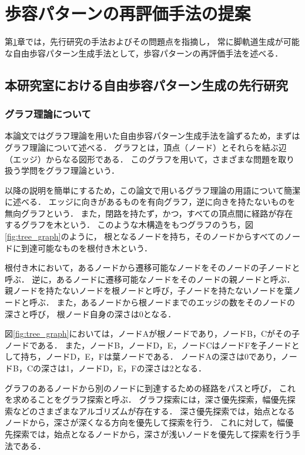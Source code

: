 ﻿%


\chapter{歩容パターンの再評価手法の提案}\label{chapter:歩容パターンの再評価手法の提案}
第\ref{chapter:歩容パターンの再評価手法の提案}章では，先行研究の手法およびその問題点を指摘し，
常に脚軌道生成が可能な自由歩容パターン生成手法として，歩容パターンの再評価手法を述べる．

\section{本研究室における自由歩容パターン生成の先行研究}
\subsection{グラフ理論について}
本論文ではグラフ理論を用いた自由歩容パターン生成手法を論ずるため，まずはグラフ理論について述べる．
グラフとは，頂点（ノード）とそれらを結ぶ辺（エッジ）からなる図形である．
このグラフを用いて，さまざまな問題を取り扱う学問をグラフ理論という．

以降の説明を簡単にするため，この論文で用いるグラフ理論の用語について簡潔に述べる．
エッジに向きがあるものを有向グラフ，逆に向きを持たないものを無向グラフという．
また，閉路を持たず，かつ，すべての頂点間に経路が存在するグラフを木という．
このような木構造をもつグラフのうち，図\ref*{fig:tree_graph}のように，
根となるノードを持ち，そのノードからすべてのノードに到達可能なものを根付き木という．

根付き木において，あるノードから遷移可能なノードをそのノードの子ノードと呼ぶ．
逆に，あるノードに遷移可能なノードをそのノードの親ノードと呼ぶ．
親ノードを持たないノードを根ノードと呼び，子ノードを持たないノードを葉ノードと呼ぶ．
また，あるノードから根ノードまでのエッジの数をそのノードの深さと呼び，
根ノード自身の深さは0となる．

図\ref*{fig:tree_graph}においては，ノードAが根ノードであり，ノードB，Cがその子ノードである．
また，ノードB，ノードD，E，ノードCはノードFを子ノードとして持ち，ノードD，E，Fは葉ノードである．
ノードAの深さは0であり，ノードB，Cの深さは1，ノードD，E，Fの深さは2となる．

グラフのあるノードから別のノードに到達するための経路をパスと呼び，
これを求めることをグラフ探索と呼ぶ．
グラフ探索には，深さ優先探索，幅優先探索などのさまざまなアルゴリズムが存在する．
深さ優先探索では，始点となるノードから，深さが深くなる方向を優先して探索を行う．
これに対して，幅優先探索では，始点となるノードから，深さが浅いノードを優先して探索を行う手法である．

